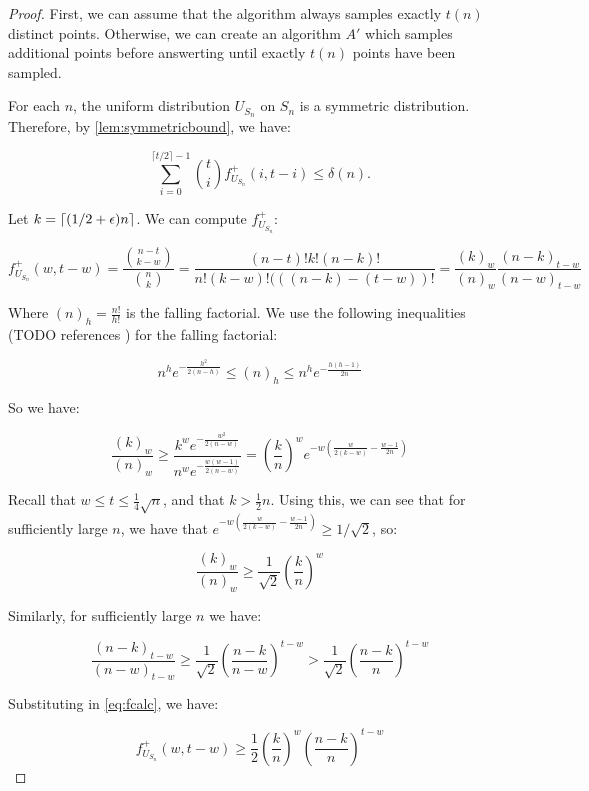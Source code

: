 \begin{proof}

First, we can assume that the algorithm always samples exactly $t(n)$ distinct points. Otherwise,
we can create an algorithm $A'$ which samples additional points before answerting
until exactly $t(n)$ points have been sampled.

For each $n$, the uniform distribution $U_{S_n}$ on $S_n$ is a symmetric distribution. 
Therefore, by \cref{lem:symmetricbound}, we have:

$$
\sum_{i=0}^{\lceil t/2 \rceil-1} \binom{t}{i} f^+_{U_{S_n}}(i, t-i) \leq \delta(n).
$$

Let $k = \lceil(1/2+\epsilon)n\rceil$. We can compute $f^+_{U_{S_n}}$:


\begin{equation}
\label{eq:fcalc}
f^+_{U_{S_n}}(w, t-w) = \frac{\binom{n-t}{k-w}}{\binom{n}{k}} = \frac{(n-t)!k!(n-k)!}{n!(k-w)!(((n-k)-(t-w))!}
    = \frac{(k)_w}{(n)_w} \frac{(n-k)_{t-w}}{(n-w)_{t-w}}
\end{equation}

Where $(n)_h = \frac{n!}{h!}$ is the falling factorial. We use the following inequalities 
(TODO references )
    for the falling
factorial:

$$
n^h e^{-\frac{h^2}{2(n-h)}} \leq (n)_h \leq n^h e^{-\frac{h(h-1)}{2n}}
$$

So we have:

$$
\frac{(k)_w}{(n)_w} \geq \frac{k^we^{-\frac{w^2}{2(n-w)}}}{n^we^{-\frac{w(w-1)}{2(n-w)}}} = \left(\frac{k}{n}\right)^w e^{-w\left(\frac{w}{2(k-w)}-\frac{w-1}{2n}\right)}
$$

Recall that $w \leq t \leq \frac{1}{4}\sqrt{n}$, and that $k > \frac{1}{2}n$. Using this, we can see that for sufficiently large $n$, we have that $e^{-w\left(\frac{w}{2(k-w)}-\frac{w-1}{2n}\right)} \geq 1/\sqrt{2}$, so:

$$
\frac{(k)_w}{(n)_w} \geq \frac{1}{\sqrt{2}}  \left(\frac{k}{n}\right)^w
$$

Similarly, for sufficiently large $n$ we have:

$$
\frac{(n-k)_{t-w}}{(n-w)_{t-w}} \geq \frac{1}{\sqrt{2}} \left(\frac{n-k}{n-w} \right)^{t-w} > \frac{1}{\sqrt{2}} \left(\frac{n-k}{n} \right)^{t-w}
$$

Substituting in \eqref{eq:fcalc}, we have:

$$
f^+_{U_{S_n}}(w, t-w)  \geq \frac{1}{2} \left(\frac{k}{n}\right)^w \left(\frac{n-k}{n} \right)^{t-w}
$$
    

\end{proof}
